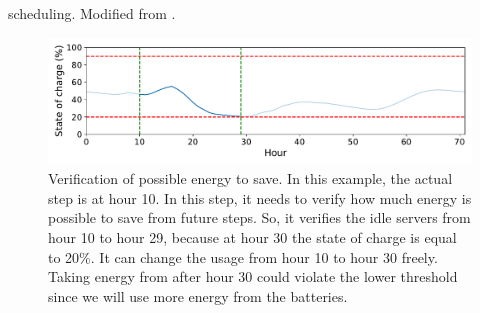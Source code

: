 \IncMargin{1em}
\begin{algorithm}[!htb]
    \LinesNumbered
    \footnotesize
    \SetAlgoLined
    \caption{\emph{\systemName} scheduling. Modified from \cite{lelong2018tuning}.}
    \label{alg:algo_scheduling_heuristic}
\end{algorithm}
\DecMargin{1em}

\begin{figure}[!htb]
    \centering
    \includegraphics[scale=0.34]{Images/Heuristics/idle_machines.pdf}
    \caption{Verification of possible energy to save. In this example, the actual step is at hour 10. In this step, it needs to verify how much energy is possible to save from future steps. So, it verifies the idle servers from hour 10 to hour 29, because at hour 30 the state of charge is equal to 20\%. It can change the usage from hour 10 to hour 30 freely. Taking energy from after hour 30 could violate the lower threshold since we will use more energy from the batteries.}
    \label{fig:idle_machines_verification}
\end{figure}

